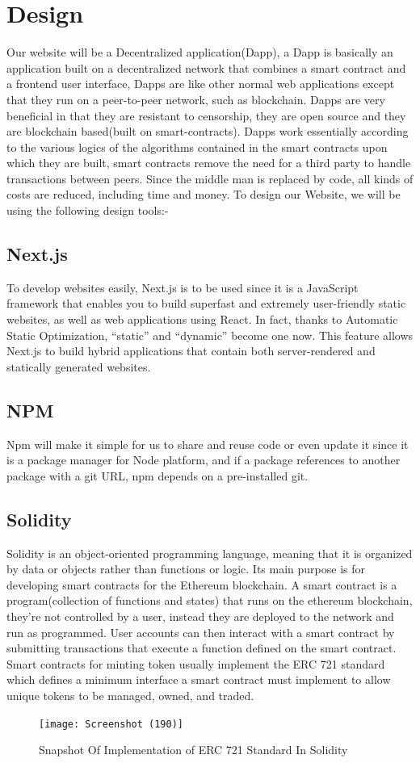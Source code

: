\documentclass[a4paper,12pt]{article}
\begin{document}
\section{Design}
Our website will be a Decentralized application(Dapp), a Dapp is basically an application built on a decentralized network that combines a smart contract and a frontend user interface, Dapps are like other normal web applications except that they run on a peer-to-peer network, such as blockchain. Dapps are very beneficial in that they are resistant to censorship, they are open source and they are blockchain based(built on smart-contracts). Dapps work essentially according to the various logics of the algorithms contained in the smart contracts upon which they are built, smart contracts remove the need for a third party to handle transactions between peers. Since the middle man is replaced by code, all kinds of costs are reduced, including time and money.
To design our Website, we will be using the following design tools:-

\subsection{Next.js}
To develop websites easily, Next.js is to be used since it is a JavaScript framework that enables you to build superfast and extremely user-friendly static websites, as well as web applications using React. In fact, thanks to Automatic Static Optimization, “static” and “dynamic” become one now.
This feature allows Next.js to build hybrid applications that contain both server-rendered and statically generated websites.


\subsection{NPM}

Npm will make it simple for us to share and reuse code or even update it since it is a package manager for Node platform, and if a package references to another package with a git URL, npm depends on a pre-installed git.


\subsection{Solidity}

Solidity is an object-oriented programming language, meaning that it is organized by data or objects rather than functions or logic. Its main purpose is for developing smart contracts for the Ethereum blockchain. A smart contract is a program(collection of functions and states) that runs on the ethereum blockchain, they're not controlled by a user, instead they are deployed to the network and run as programmed. User accounts can then interact with a smart contract by submitting transactions that execute a function defined on the smart contract. Smart contracts for minting token usually implement the ERC 721 standard which defines a minimum interface a smart contract must implement to allow unique tokens to be managed, owned, and traded.
\begin{figure}[h]
\centering
\texttt{[image: Screenshot (190)]}
\caption{Snapshot Of Implementation of ERC 721 Standard In Solidity}
\end{figure}
\newpage
\end{document}
